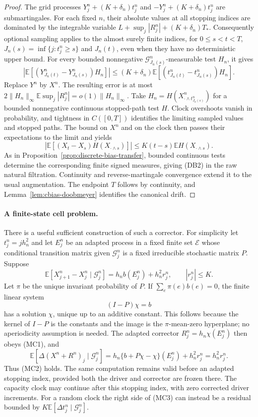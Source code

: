 \documentclass[11pt]{article}
\theoremstyle{definition}\newtheorem{definition}[theorem]{Definition}
\theoremstyle{remark}\newtheorem{remark}[theorem]{Remark}
\begin{document}
\begin{proof}
The grid processes $Y^n_j+(K+\delta_n)t^n_j$ and
$-Y^n_j+(K+\delta_n)t^n_j$ are submartingales. For each fixed $n$,
their absolute values at all stopping indices are dominated by the
integrable variable $L+\sup_j|R^n_j|+(K+\delta_n)T_*$.
Consequently optional sampling applies to the almost surely finite
indices, for $0\le s<t<T$, $J_n(s)=\inf\{j:t^n_j\ge s\}$ and $J_n(t)$, even when
they have no deterministic upper bound. For every bounded nonnegative
$\mathcal G^n_{J_n(s)}$-measurable test $H_n$, it gives
\[
 \left|\mathbb E[(Y^n_{J_n(t)}-Y^n_{J_n(s)})H_n]\right|
 \le(K+\delta_n)
       \mathbb E[(t^n_{J_n(t)}-t^n_{J_n(s)})H_n].
\]
Replace $Y^n$ by $X^n$. The resulting error is at most
$2\|H_n\|_\infty\mathbb E\sup_j|R^n_j|=o(1)\|H_n\|_\infty$.
Take $H_n=H(X^n_{\cdot\wedge t^n_{J_n(s)}})$ for a bounded
nonnegative continuous stopped-path test $H$. Clock overshoots vanish
in probability, and tightness in $C([0,T])$ identifies the limiting
sampled values and stopped paths. The bound on $X^n$ and on the clock
then passes their expectations to the limit and yields
\[
 |\mathbb E[(X_t-X_s)H(X_{\cdot\wedge s})]|
 \le K(t-s)\mathbb E H(X_{\cdot\wedge s}).
\]
As in Proposition~\ref{prop:discrete-bias-transfer}, bounded continuous
tests determine the corresponding finite signed measures, giving (DB2)
in the raw natural filtration. Continuity and reverse-martingale
convergence extend it to the usual augmentation. The endpoint $T$
follows by continuity, and Lemma~\ref{lem:cbias-doobmeyer} identifies the
canonical drift.
\end{proof}

\paragraph{A finite-state cell problem.}
There is a useful sufficient construction of such a corrector. For
simplicity let $t^n_j=jh_n^2$ and let $E^n_j$ be an adapted process in
a fixed finite set $\mathcal E$ whose conditional transition matrix given
$\mathcal G^n_j$ is a fixed irreducible stochastic matrix $P$.
Suppose
\[
 \mathbb E[X^n_{j+1}-X^n_j\mid\mathcal G^n_j]
       =h_n b(E^n_j)+h_n^2r^n_j,\qquad |r^n_j|\le K.
 \tag{MC3}
\]
Let $\pi$ be the unique invariant probability of $P$. If
$\sum_e\pi(e)b(e)=0$, the finite linear system
\[
 (I-P)\chi=b
 \tag{MC4}
\]
has a solution $\chi$, unique up to an additive constant. This follows
because the kernel of $I-P$ is the constants and the image is the
$\pi$-mean-zero hyperplane; no aperiodicity assumption is needed.
The adapted corrector $R^n_j=h_n\chi(E^n_j)$ then obeys (MC1), and
\[
 \mathbb E[\Delta(X^n+R^n)_j\mid\mathcal G^n_j]
 =h_n\{b+P\chi-\chi\}(E^n_j)+h_n^2r^n_j
 =h_n^2r^n_j.
\]
Thus (MC2) holds. The same computation remains valid before an adapted
stopping index, provided both the driver and corrector are frozen there. The capacity
clock may continue after this stopping index, with zero corrected
driver increments.
For a random clock the right side of (MC3) can instead be a residual
bounded by $K\mathbb E[\Delta t^n_j\mid\mathcal G^n_j]$.
\end{document}
